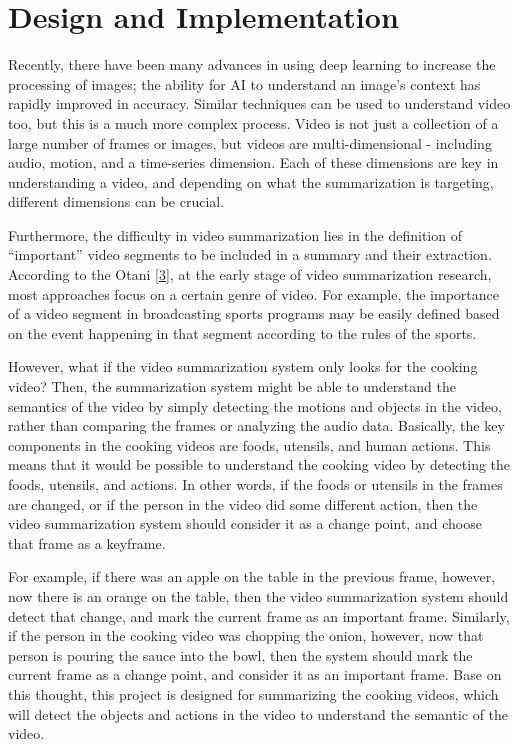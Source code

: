 \documentclass{article}
\begin{document}
\section{Design and Implementation}

Recently, there have been many advances in using deep learning to increase the processing of images; the ability for AI to understand an image’s context has rapidly improved in accuracy. Similar techniques can be used to understand video too, but this is a much more complex process. Video is not just a collection of a large number of frames or images, but videos are multi-dimensional - including audio, motion, and a time-series dimension. Each of these dimensions are key in understanding a video, and depending on what the summarization is targeting, different dimensions can be crucial.

Furthermore, the difficulty in video summarization lies in the definition of “important” video segments to be included in a summary and their extraction. According to the Otani \hyperlink{ref3}{[3]}, at the early stage of video summarization research, most approaches focus on a certain genre of video. For example, the importance of a video segment in broadcasting sports programs may be easily defined based on the event happening in that segment according to the rules of the sports.

However, what if the video summarization system only looks for the cooking video? Then, the summarization system might be able to understand the semantics of the video by simply detecting the motions and objects in the video, rather than comparing the frames or analyzing the audio data. Basically, the key components in the cooking videos are foods, utensils, and human actions. This means that it would be possible to understand the cooking video by detecting the foods, utensils, and actions. In other words, if the foods or utensils in the frames are changed, or if the person in the video did some different action, then the video summarization system should consider it as a change point, and choose that frame as a keyframe.

For example, if there was an apple on the table in the previous frame, however, now there is an orange on the table, then the video summarization system should detect that change, and mark the current frame as an important frame. Similarly, if the person in the cooking video was chopping the onion, however, now that person is pouring the sauce into the bowl, then the system should mark the current frame as a change point, and consider it as an important frame. Base on this thought, this project is designed for summarizing the cooking videos, which will detect the objects and actions in the video to understand the semantic of the video.
\end{document}
